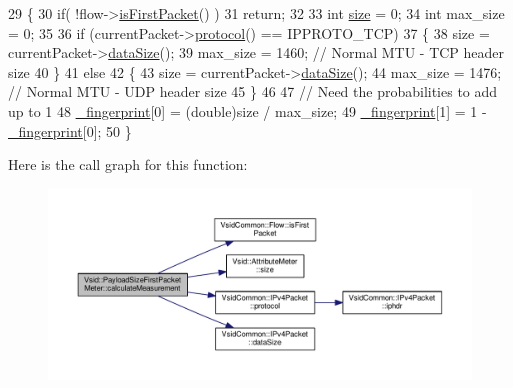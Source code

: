\begin{DoxyCode}
29 \{   
30     \textcolor{keywordflow}{if}( !flow->\hyperlink{class_vsid_common_1_1_flow_ae437ae88fb48d6ac2880f40fc88195da}{isFirstPacket}() )
31         \textcolor{keywordflow}{return};
32 
33     \textcolor{keywordtype}{int} \hyperlink{class_vsid_1_1_attribute_meter_a6243f852b5ef8e24d8015e2018037d2c}{size} = 0;
34     \textcolor{keywordtype}{int} max\_size = 0;
35 
36     \textcolor{keywordflow}{if} (currentPacket->\hyperlink{class_vsid_common_1_1_i_pv4_packet_ac1ff979633726d9f558bce1210595879}{protocol}() == IPPROTO\_TCP) 
37     \{
38         size = currentPacket->\hyperlink{class_vsid_common_1_1_i_pv4_packet_a39fe36210895625ee87320f5c0c7f52e}{dataSize}();
39         max\_size = 1460; \textcolor{comment}{// Normal MTU - TCP header size}
40     \}
41     \textcolor{keywordflow}{else} 
42     \{
43         size = currentPacket->\hyperlink{class_vsid_common_1_1_i_pv4_packet_a39fe36210895625ee87320f5c0c7f52e}{dataSize}();
44         max\_size = 1476; \textcolor{comment}{// Normal MTU - UDP header size}
45     \}
46 
47     \textcolor{comment}{// Need the probabilities to add up to 1}
48     \hyperlink{class_vsid_1_1_attribute_meter_a0386b2fe9c5d6ab6fba16029d8da4efe}{\_fingerprint}[0] = (double)size / max\_size;
49     \hyperlink{class_vsid_1_1_attribute_meter_a0386b2fe9c5d6ab6fba16029d8da4efe}{\_fingerprint}[1] = 1 - \hyperlink{class_vsid_1_1_attribute_meter_a0386b2fe9c5d6ab6fba16029d8da4efe}{\_fingerprint}[0];
50 \}\end{DoxyCode}


Here is the call graph for this function\-:
\nopagebreak
\begin{figure}[H]
\begin{center}
\leavevmode
\includegraphics[width=350pt]{class_vsid_1_1_payload_size_first_packet_meter_a3e20bc06d7a06de0b9c1cdf5ab6ff880_cgraph}
\end{center}
\end{figure}


